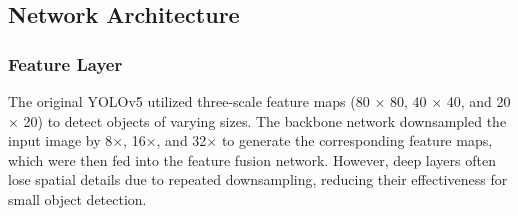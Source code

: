 \documentclass[preprint,review,12pt]{elsarticle}
\begin{document}
\subsection{Network Architecture}






\subsubsection{Feature Layer}
The original YOLOv5 utilized three-scale feature maps (80 × 80, 40 × 40, and 20 × 20) to detect objects of varying sizes. The backbone network downsampled the input image by 8×, 16×, and 32× to generate the corresponding feature maps, which were then fed into the feature fusion network. However, deep layers often lose spatial details due to repeated downsampling, reducing their effectiveness for small object detection. 
\end{document}
